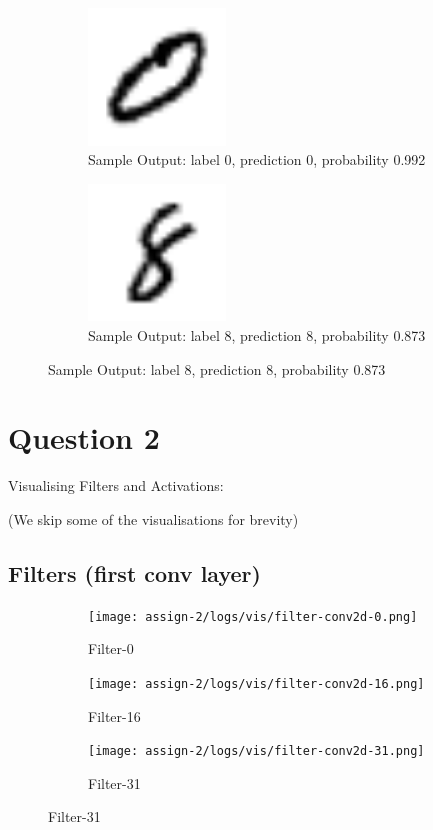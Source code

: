 \begin{figure}[h]
\begin{subfigure}
\centering
\includegraphics[angle=0,width=0.4\textwidth]{assign-2/logs/0.png}
\caption{Sample Output: label 0, prediction 0, probability 0.992}
\end{subfigure}
\begin{subfigure}
\centering
\includegraphics[angle=0,width=0.4\textwidth]{assign-2/logs/8.png}
\caption{Sample Output: label 8, prediction 8, probability 0.873}
\end{subfigure}
\end{figure}

\section{Question 2}

Visualising Filters and Activations:

(We skip some of the visualisations for brevity)

\subsection{Filters (first conv layer)}
\begin{figure}[h]
\begin{subfigure}
\centering
\texttt{[image: assign-2/logs/vis/filter-conv2d-0.png]}
\caption{Filter-0}
\end{subfigure}
\begin{subfigure}
\centering
\texttt{[image: assign-2/logs/vis/filter-conv2d-16.png]}
\caption{Filter-16}
\end{subfigure}
\begin{subfigure}
\centering
\texttt{[image: assign-2/logs/vis/filter-conv2d-31.png]}
\caption{Filter-31}
\end{subfigure}
\end{figure}

